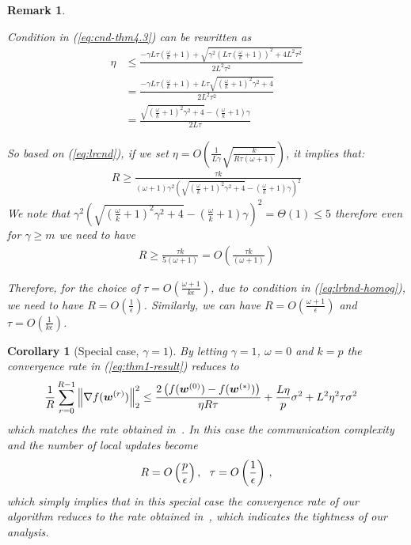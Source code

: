 \documentclass{article}
\newtheorem{remark}{Remark}
\newtheorem{corollary}{Corollary}
\begin{document}
\begin{remark}\label{rmk:cnd-lr}

Condition in (\ref{eq:cnd-thm4.3}) can be rewritten as 
\begin{align}
    \eta&\leq \frac{-\gamma L\tau\left(\frac{\omega}{k}+1\right)+\sqrt{\gamma^2 \left(L\tau\left(\frac{\omega}{k}+1\right)\right)^2+4L^2\tau^2}}{2L^2\tau^2}\nonumber\\
    &= \frac{-\gamma L\tau\left(\frac{\omega}{k}+1\right)+L\tau\sqrt{\left(\frac{\omega}{k}+1\right)^2\gamma^2 +4}}{2L^2\tau^2}\nonumber\\
    &=\frac{\sqrt{\left(\frac{\omega}{k}+1\right)^2\gamma^2 +4}-\left(\frac{\omega}{k}+1\right)\gamma}{2L\tau}\label{eq:lrcnd}
\end{align}

So based on (\ref{eq:lrcnd}), if we set $\eta=O\left(\frac{1}{L\gamma}\sqrt{\frac{k}{R\tau\left(\omega+1\right)}}\right)$, it implies that:
\begin{align}
    R\geq \frac{\tau k}{\left(\omega+1\right)\gamma^2\left(\sqrt{\left(\frac{\omega}{k}+1\right)^2\gamma^2+4}-\left(\frac{\omega}{k}+1\right)\gamma\right)^2}\label{eq:iidexact}
\end{align}
We note that $\gamma^2\left(\sqrt{\left(\frac{\omega}{k}+1\right)^2\gamma^2+4}-\left(\frac{\omega}{k}+1\right)\gamma\right)^2=\Theta(1)\leq 5 $ therefore even for $\gamma\geq m$ we need to have 
\begin{align}
    R\geq \frac{\tau k}{5\left(\omega+1\right)}=O\left(\frac{\tau k}{\left(\omega+1\right)}\right)\label{eq:lrbnd-homog}
\end{align}

{Therefore, for the choice of $\tau=O\left(\frac{\omega+1}{k\epsilon}\right)$, due to condition in (\ref{eq:lrbnd-homog}), we need to have $R=O\left(\frac{1}{\epsilon}\right)$. Similarly, we can have $R=O\left(\frac{\omega+1}{\epsilon}\right)$ and $\tau=O\left(\frac{1}{k\epsilon}\right)$.}


\end{remark}

\begin{corollary}[Special case, $\gamma=1$]
By letting $\gamma=1$, $\omega=0$ and $k=p$ the convergence rate in (\ref{eq:thm1-result}) reduces to 
\begin{align}\notag
     \frac{1}{R}\sum_{r=0}^{R-1}\left\|\nabla f({\boldsymbol{w}}^{(r)})\right\|_2^2&\leq \frac{2\left(f(\boldsymbol{w}^{(0)})-f(\boldsymbol{w}^{(*)})\right)}{\eta R\tau}+\frac{L\eta }{p}\sigma^2+{L^2\eta^2\tau }\sigma^2
\end{align}
which matches the rate  obtained in~\citet{wang2018cooperative}. In this case the communication complexity and the number of local updates become 
\begin{align}\notag
    {R}=O\left(\frac{p}{\epsilon}\right), \:\:\: \tau=O\left(\frac{1}{\epsilon}\right) \, ,
\end{align}
which simply implies  that in this special case the convergence rate of our algorithm reduces to the  rate obtained in~\citet{wang2018cooperative}, which indicates the tightness of  our analysis.
\end{corollary}
\end{document}
